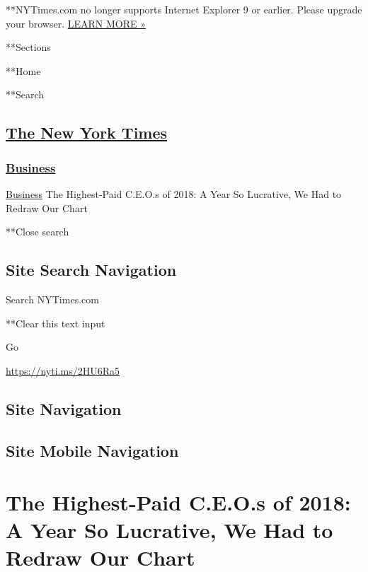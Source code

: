  **NYTimes.com no longer supports Internet Explorer 9 or earlier. Please
upgrade your browser.
\href{http://www.nytimes3xbfgragh.onion/content/help/site/ie9-support.html}{LEARN
MORE »}

**Sections

**Home

**Search

\hypertarget{the-new-york-times}{%
\subsection{\texorpdfstring{\href{http://www.nytimes3xbfgragh.onion/}{The
New York Times}}{The New York Times}}\label{the-new-york-times}}

\hypertarget{-business-}{%
\subsubsection{\texorpdfstring{ \href{/section/business}{Business}
}{ Business }}\label{-business-}}

 \href{/section/business}{Business} \textbar{}The Highest-Paid C.E.O.s
of 2018: A Year So Lucrative, We Had to Redraw Our Chart

**Close search

\hypertarget{site-search-navigation}{%
\subsection{Site Search Navigation}\label{site-search-navigation}}

Search NYTimes.com

**Clear this text input

Go

\url{https://nyti.ms/2HU6Ra5}

\hypertarget{site-navigation}{%
\subsection{Site Navigation}\label{site-navigation}}

\hypertarget{site-mobile-navigation}{%
\subsection{Site Mobile Navigation}\label{site-mobile-navigation}}

\hypertarget{the-highest-paid-ceos-of-2018-a-year-so-lucrative-we-had-to-redraw-our-chart}{%
\section{The Highest-Paid C.E.O.s of 2018: A Year So Lucrative, We Had
to Redraw Our
Chart}\label{the-highest-paid-ceos-of-2018-a-year-so-lucrative-we-had-to-redraw-our-chart}}

